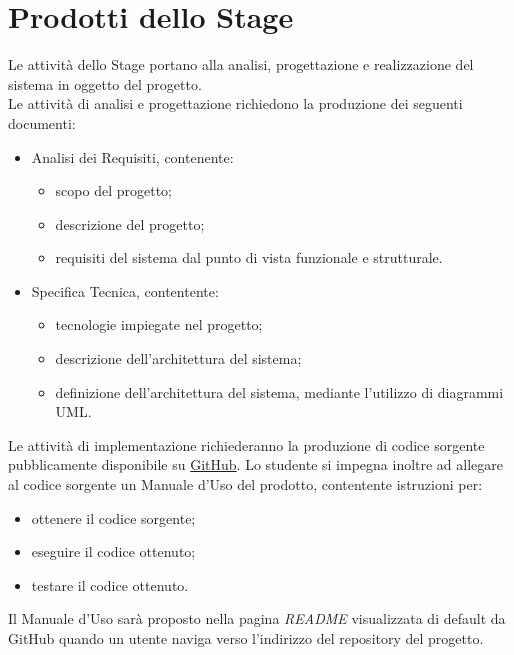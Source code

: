 \documentclass[a4paper]{article}
\begin{document}
\section*{Prodotti dello Stage}
Le attività dello Stage portano alla analisi, progettazione e realizzazione del sistema in oggetto del progetto.\\
Le attività di analisi e progettazione richiedono la produzione dei seguenti documenti:
\begin{itemize}
	\item Analisi dei Requisiti, contenente: \begin{itemize}
		\item scopo del progetto;
		\item descrizione del progetto;
		\item requisiti del sistema dal punto di vista funzionale e strutturale.
	\end{itemize}
	\item Specifica Tecnica, contentente: \begin{itemize}
		\item tecnologie impiegate nel progetto;
		\item descrizione dell'architettura del sistema;
		\item definizione dell'architettura del sistema, mediante l'utilizzo di diagrammi UML.
	\end{itemize}
\end{itemize}
Le attività di implementazione richiederanno la produzione di codice sorgente pubblicamente disponibile su \href{https://github.com}{GitHub}.
Lo studente si impegna inoltre ad allegare al codice sorgente un Manuale d'Uso del prodotto, contentente istruzioni per: \begin{itemize}
	\item ottenere il codice sorgente;
	\item eseguire il codice ottenuto;
	\item testare il codice ottenuto.
\end{itemize}
Il Manuale d'Uso sarà proposto nella pagina \textit{README} visualizzata di default da GitHub quando un utente naviga verso l'indirizzo del repository del progetto.

\clearpage
\end{document}
